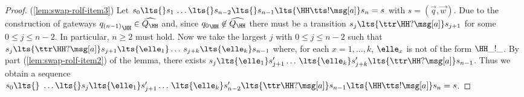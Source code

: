 \begin{proof}
(\ref{lem:swap-rolf-item3})
Let $s_0\lts{}  s_1\,\ldots \lts{} s_{n-2}  \lts{} s_{n-1}\lts{\HH\tts!\msg[a]}s_n=s$ with $s = (\vec{q},\vec{w})$.
 Due to the construction of gateways
 ${q_{(n-1)}}_{\HH}\in\widehat{Q_{\HH}}$
 and, since ${q_0}_{\HH}\not\in\widehat{Q_{\HH}}$ %
 there must be a transition $s_j \lts{\ttr\HH?\msg[a]}s_{j+1}$ for
 some $0\leq j \leq n-2$. In particular, $n \geq 2$ must hold.
Now we take the largest $j$ with $0\leq j \leq n-2$ such that
 $s_j  \lts{\ttr\HH?\msg[a]} s_{j+1}\lts{\elle_1}\ldots\, s_{j+k}\lts{\elle_{k}}s_{n-1}$
 where, for each $x = 1,\ldots,k$,  $\elle_x$ is not of the form $\HH\_!\_$.
By part (\ref{lem:swap-rolf-item2}) of the lemma, there exists
 $s_j  \lts{\elle_1}s'_{j+1} \ldots\,  \lts{\elle_k} s'_{j+k} \lts{\ttr\HH?\msg[a]} s_{n-1}$. Thus we obtain a sequence
$s_0\lts{}\,\,\ldots \lts{}s_j  \lts{\elle_1}s'_{j+1} \ldots\,  \lts{\elle_k} s'_{n-2}\lts{\ttr\HH?\msg[a]}s_{n-1}\lts{\HH\tts!\msg[a]}s_n=s$.
 
 
\end{proof}



%

